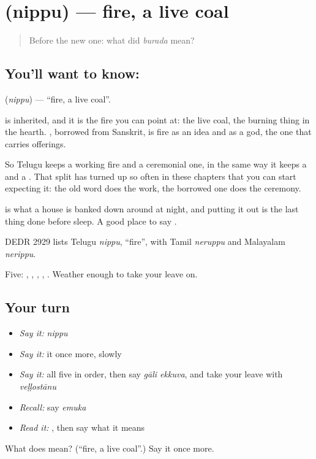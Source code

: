 \section[\texorpdfstring{\te{నిప్పు} (nippu)}{నిప్పు (nippu)}]{ (nippu) — fire, a live coal}

\label{lesson:TE-C59-fire}



\begin{quote}
Before the new one: what did \emph{burada} mean?
\end{quote}

\subsection*{You'll want to know: }
\textbf{} (\emph{nippu}) — \textquotedblleft{}fire, a live coal\textquotedblright{}.

 is inherited, and it is the fire you can point at: the live coal, the burning thing in the hearth. , borrowed from Sanskrit, is fire as an idea and as a god, the one that carries offerings.

So Telugu keeps a working fire and a ceremonial one, in the same way it keeps a  and a . That split has turned up so often in these chapters that you can start expecting it: the old word does the work, the borrowed one does the ceremony.

 is what a house is banked down around at night, and putting it out is the last thing done before sleep. A good place to say .

DEDR 2929 lists Telugu \emph{nippu}, \textquotedblleft{}fire\textquotedblright{}, with Tamil \emph{neruppu} and Malayalam \emph{nerippu}.

\begin{grammarlens}[title={What you've built}]
Five: , , , , . Weather enough to take your leave on.
\end{grammarlens}

\subsection*{Your turn}
\begin{itemize}
\raggedright
  \item \emph{Say it:} \emph{nippu}
  \item \emph{Say it:} it once more, slowly
  \item \emph{Say it:} all five in order, then say \emph{gāli ekkuva}, and take your leave with \emph{veḷḷostānu}
  \item \emph{Recall:} say \emph{emuka}
  \item \emph{Read it:} \textbf{}, then say what it means
\end{itemize}

\begin{tcolorbox}[breakable,colback=teal!4,colframe=teal!35!black,title={Before you move on}]
What does  mean? (\textquotedblleft{}fire, a live coal\textquotedblright{}.) Say it once more.
\end{tcolorbox}
